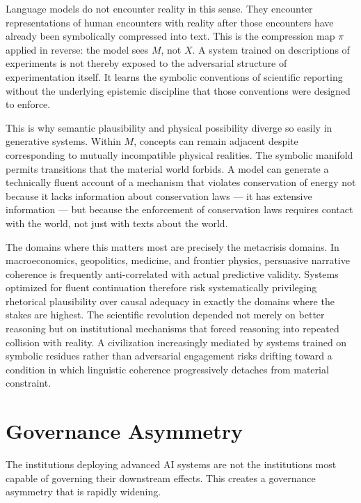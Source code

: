 \documentclass[12pt, a4paper]{article}
\theoremstyle{remark}
\begin{document}
Language models do not encounter reality in this sense. They encounter representations of human encounters with reality after those encounters have already been symbolically compressed into text. This is the compression map $\pi$ applied in reverse: the model sees $M$, not $X$. A system trained on descriptions of experiments is not thereby exposed to the adversarial structure of experimentation itself. It learns the symbolic conventions of scientific reporting without the underlying epistemic discipline that those conventions were designed to enforce.

This is why semantic plausibility and physical possibility diverge so easily in generative systems. Within $M$, concepts can remain adjacent despite corresponding to mutually incompatible physical realities. The symbolic manifold permits transitions that the material world forbids. A model can generate a technically fluent account of a mechanism that violates conservation of energy not because it lacks information about conservation laws --- it has extensive information --- but because the enforcement of conservation laws requires contact with the world, not just with texts about the world.

The domains where this matters most are precisely the metacrisis domains. In macroeconomics, geopolitics, medicine, and frontier physics, persuasive narrative coherence is frequently anti-correlated with actual predictive validity. Systems optimized for fluent continuation therefore risk systematically privileging rhetorical plausibility over causal adequacy in exactly the domains where the stakes are highest. The scientific revolution depended not merely on better reasoning but on institutional mechanisms that forced reasoning into repeated collision with reality. A civilization increasingly mediated by systems trained on symbolic residues rather than adversarial engagement risks drifting toward a condition in which linguistic coherence progressively detaches from material constraint.

\section{Governance Asymmetry}

The institutions deploying advanced AI systems are not the institutions most capable of governing their downstream effects. This creates a governance asymmetry that is rapidly widening.
\end{document}
